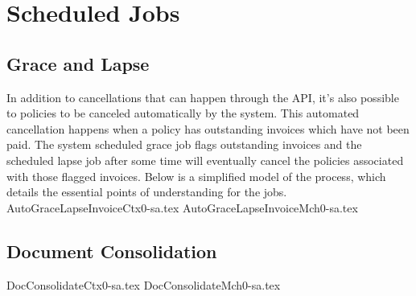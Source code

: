 \motto{}
\chapter{Scheduled Jobs}
\label{intro} %

\abstract{}

\section{Grace and Lapse}
\label{sec:jobs:1}
In addition to cancellations that can happen through the API, it's also possible to policies to be canceled automatically by
the system. This automated cancellation happens when a policy has outstanding invoices which have not been paid. The system
scheduled grace job flags outstanding invoices and the scheduled lapse job after some time will eventually cancel the policies
associated with those flagged invoices. Below is a simplified model of the process, which details the essential points of
understanding for the jobs.
{AutoGraceLapseInvoiceCtx0-sa.tex}
{AutoGraceLapseInvoiceMch0-sa.tex}

\section{Document Consolidation}
\label{sec:jobs:2}
{DocConsolidateCtx0-sa.tex}
{DocConsolidateMch0-sa.tex}
